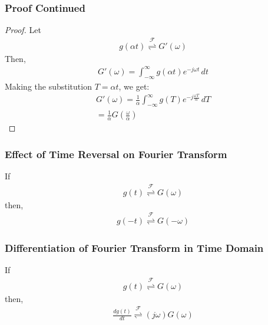 \documentclass{beamer}
\providecommand{\brak}[1]{\ensuremath{\left(#1\right)}}
\providecommand{\fourier}{\overset{\mathcal{F}}{ \rightleftharpoons}}
\begin{document}
\begin{frame}[fragile]
\frametitle{Proof Continued}
\begin{flushleft}
\begin{proof}
Let 
\begin{align}
    g(\alpha t) \fourier G'(\omega)
\end{align}
Then,
\begin{align}
    G'(\omega) = \int_{-\infty}^\infty g(\alpha t) e^{-j \omega t} \,dt
\end{align}
Making the substitution $T = \alpha t$, we get:
\begin{align}
     G'(\omega) = \frac{1}{\alpha}\int_{-\infty}^\infty g(T) e^{-j \frac{\omega T}{\alpha}} \,dT\\
     = \frac{1}{\alpha}G\brak{\frac{\omega}{\alpha}}
\end{align}
\end{proof}
\end{flushleft}

\end{frame}

\begin{frame}[fragile]
\frametitle{Effect of Time Reversal on Fourier Transform}
\begin{flushleft}
\begin{corollary}
If 
\begin{align}
    g(t) \fourier G(\omega)
\end{align}
then,
\begin{align}
    g(- t) \fourier G(-\omega)
\end{align}
\label{reverse}
\end{corollary}
\end{flushleft}

\end{frame}

\begin{frame}[fragile]
\frametitle{Differentiation of Fourier Transform in Time Domain}
\begin{flushleft}
\begin{lemma}
If 
\begin{align}
    g(t) \fourier G(\omega)
\end{align}
then,
\begin{align}
    \frac{d g(t)}{dt} \fourier (j\omega) G(\omega)
\end{align}
\label{diff}
\end{lemma}
\end{flushleft}

\end{frame}
\end{document}
